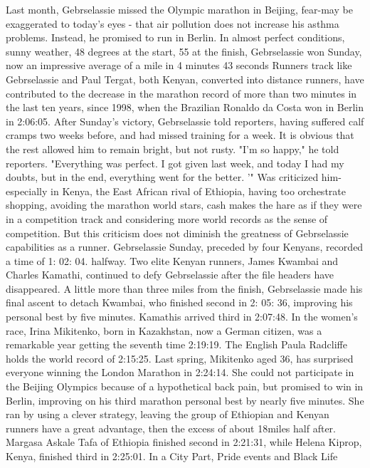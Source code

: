 Last month, Gebrselassie missed the Olympic marathon in Beijing, fear-may be exaggerated to today's eyes - that air pollution does not increase his asthma problems.
Instead, he promised to run in Berlin.
In almost perfect conditions, sunny weather, 48 degrees at the start, 55 at the finish, Gebrselassie won Sunday, now an impressive average of a mile in 4 minutes 43 seconds
Runners track like Gebrselassie and Paul Tergat, both Kenyan, converted into distance runners, have contributed to the decrease in the marathon record of more than two minutes in the last ten years, since 1998, when the Brazilian Ronaldo da Costa won in Berlin in 2:06:05.
After Sunday's victory, Gebrselassie told reporters, having suffered calf cramps two weeks before, and had missed training for a week.
It is obvious that the rest allowed him to remain bright, but not rusty.
"I'm so happy," he told reporters.
"Everything was perfect.
I got given last week, and today I had my doubts, but in the end, everything went for the better. '"
Was criticized him-especially in Kenya, the East African rival of Ethiopia, having too orchestrate shopping, avoiding the marathon world stars, cash makes the hare as if they were in a competition track and considering more world records as the sense of competition.
But this criticism does not diminish the greatness of Gebrselassie capabilities as a runner.
Gebrselassie Sunday, preceded by four Kenyans, recorded a time of 1: 02: 04. halfway.
Two elite Kenyan runners, James Kwambai and Charles Kamathi, continued to defy Gebrselassie after the file headers have disappeared.
A little more than three miles from the finish, Gebrselassie made his final ascent to detach Kwambai, who finished second in 2: 05: 36, improving his personal best by five minutes.
Kamathis arrived third in 2:07:48.
In the women's race, Irina Mikitenko, born in Kazakhstan, now a German citizen, was a remarkable year getting the seventh time 2:19:19.
The English Paula Radcliffe holds the world record of 2:15:25.
Last spring, Mikitenko aged 36, has surprised everyone winning the London Marathon in 2:24:14.
She could not participate in the Beijing Olympics because of a hypothetical back pain, but promised to win in Berlin, improving on his third marathon personal best by nearly five minutes.
She ran by using a clever strategy, leaving the group of Ethiopian and Kenyan runners have a great advantage, then the excess of about 18miles half after.
Margasa Askale Tafa of Ethiopia finished second in 2:21:31, while Helena Kiprop, Kenya, finished third in 2:25:01.
In a City Part, Pride events and Black Life
